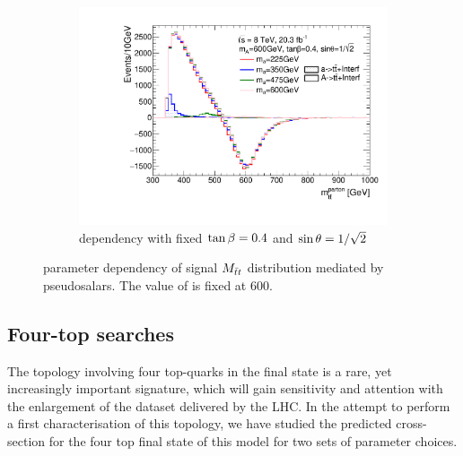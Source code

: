 \begin{figure}
\begin{subfigure}[b]{0.49\textwidth}
\includegraphics[width=\textwidth]{texinputs/04_grid/figures/ttres/ttres_2HDMa_A_ma.pdf}
\caption{\ma dependency with fixed $\tan\beta=0.4$ and $\sin\theta=1/\sqrt{2}$}
\end{subfigure}
\caption{parameter dependency of signal $M_{\bar{t}t}$ distribution mediated by pseudosalars. The value of \mA is fixed at 600\GeV.}
\label{fig:ttres_2HDM_A}
\end{figure}


\subsection{Four-top searches}

The topology involving four top-quarks in the final state is a rare,
yet increasingly important signature, which will gain sensitivity and
attention with the enlargement of the dataset delivered by the LHC.  
In the attempt to perform a first characterisation of this topology,
we have studied the predicted cross-section for the four top final
state of this model for two sets of parameter choices. 

